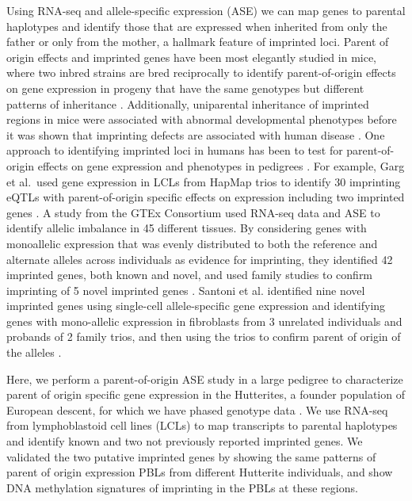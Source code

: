 Using RNA-seq and allele-specific expression (ASE) we can map genes to parental haplotypes and identify those that are expressed when inherited from only the father or only from the mother, a hallmark feature of imprinted loci. Parent of origin effects and imprinted genes have been most elegantly studied in mice, where two inbred strains are bred reciprocally to identify parent-of-origin effects on gene expression in progeny that have the same genotypes but different patterns of inheritance \cite{Babak2015}. Additionally, uniparental inheritance of imprinted regions in mice were associated with abnormal developmental phenotypes\cite{Cattanach:1985hu} before it was shown that imprinting defects are associated with human disease \cite{Nicholls:vh}. One approach to identifying imprinted loci in humans has been to test for parent-of-origin effects on gene expression and phenotypes in pedigrees \cite{Kong:2009kk,Benonisdottir:2016dz}. For example, Garg et al.~used gene expression in LCLs from HapMap trios to identify 30 imprinting eQTLs with parent-of-origin specific effects on expression including two imprinted genes \cite{Garg2012a}. A study from the GTEx Consortium used RNA-seq data and ASE to identify allelic imbalance in 45 different tissues. By considering genes with monoallelic expression that was evenly distributed to both the reference and alternate alleles across individuals as evidence for imprinting, they identified 42 imprinted genes, both known and novel, and used family studies to confirm imprinting of 5 novel imprinted genes \cite{Baran:2015cx}. Santoni et al. identified nine novel imprinted genes using single-cell allele-specific gene expression and identifying genes with mono-allelic expression in fibroblasts from 3 unrelated individuals and probands of 2 family trios, and then using the trios to confirm parent of origin of the alleles \cite{Santoni:2017hu}.

Here, we perform a parent-of-origin ASE study in a large pedigree to characterize parent of origin specific gene expression in the Hutterites, a founder population of European descent, for which we have phased genotype data \cite{Livne2015}. We use RNA-seq from lymphoblastoid cell lines (LCLs) to map transcripts to parental haplotypes and identify known and two not previously reported imprinted genes. We validated the two putative imprinted genes by showing the same patterns of parent of origin expression PBLs from different Hutterite individuals, and show DNA methylation signatures of imprinting in the PBLs at these regions.
	
